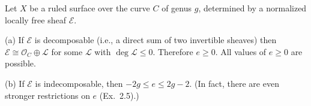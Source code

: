 Let $X$ be a ruled surface over the curve $C$ of genus $g$, determined by a normalized locally free sheaf $\mathcal{E}$.

(a) If $\mathcal{E}$ is decomposable (i.e., a direct sum of two invertible sheaves) then $\mathcal{E} \cong \mathcal{O}_C \oplus \mathcal{L}$ for some $\mathcal{L}$ with $\deg \mathcal{L} \leq 0$. Therefore $e \geq 0$. All values of $e \geq 0$ are possible.

(b) If $\mathcal{E}$ is indecomposable, then $-2g \leq e \leq 2g - 2$. (In fact, there are even stronger restrictions on $e$ (Ex.~2.5).)
